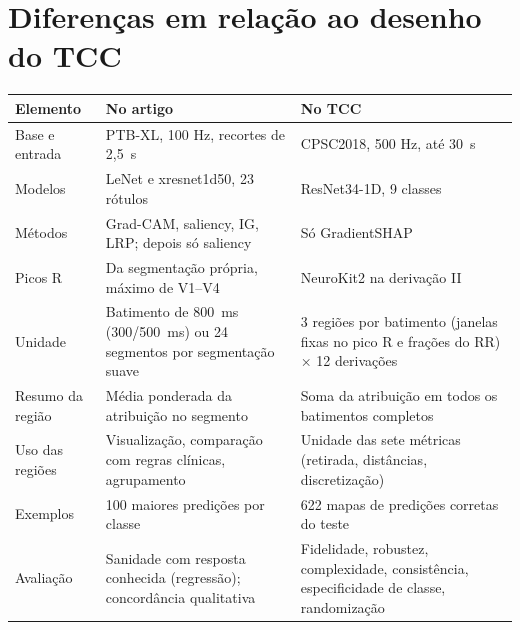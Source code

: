 \documentclass[11pt,a4paper]{article}
\begin{document}
\section{Diferenças em relação ao desenho do TCC}
\begin{center}\small
\begin{tabularx}{\linewidth}{p{2.8cm}XX}
\toprule
\textbf{Elemento} & \textbf{No artigo} & \textbf{No TCC} \\
\midrule
Base e entrada & PTB-XL, 100 Hz, recortes de 2,5~s & CPSC2018, 500 Hz, até 30~s \\
Modelos & LeNet e xresnet1d50, 23 rótulos & ResNet34-1D, 9 classes \\
Métodos & Grad-CAM, saliency, IG, LRP; depois só saliency & Só GradientSHAP \\
Picos R & Da segmentação própria, máximo de V1--V4 & NeuroKit2 na derivação II \\
Unidade & Batimento de 800~ms (300/500~ms) ou 24 segmentos por segmentação suave & 3 regiões por batimento (janelas fixas no pico R e frações do RR) × 12 derivações \\
Resumo da região & Média ponderada da atribuição no segmento & Soma da atribuição em todos os batimentos completos \\
Uso das regiões & Visualização, comparação com regras clínicas, agrupamento & Unidade das sete métricas (retirada, distâncias, discretização) \\
Exemplos & 100 maiores predições por classe & 622 mapas de predições corretas do teste \\
Avaliação & Sanidade com resposta conhecida (regressão); concordância qualitativa & Fidelidade, robustez, complexidade, consistência, especificidade de classe, randomização \\
\bottomrule
\end{tabularx}
\end{center}
\end{document}
